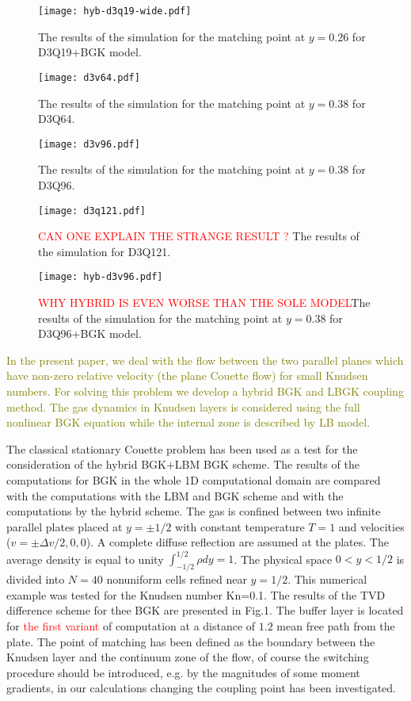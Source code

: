 \documentclass[]{elsarticle} %
\newcommand{\todo}[1]{\textcolor{olive}{#1}}
\begin{document}
{\begin{figure}[!h]
\centering
\texttt{[image: hyb-d3q19-wide.pdf]}
\caption{The  results of the simulation for the matching point at $y=0.26$ for D3Q19+BGK model.}
\end{figure}


\begin{figure}[!h]
\centering
\texttt{[image: d3v64.pdf]}
\caption{The  results of the simulation for the matching point at $y=0.38$ for D3Q64.}
\end{figure}


\begin{figure}[!h]
\centering
\texttt{[image: d3v96.pdf]}
\caption{The  results of the simulation for the matching point at $y=0.38$ for D3Q96.}
\end{figure}


\begin{figure}[!h]
\centering
\texttt{[image: d3q121.pdf]}
\caption{\textcolor{red}{CAN ONE EXPLAIN THE STRANGE RESULT ?} The  results of the simulation  for D3Q121.}
\end{figure}



\begin{figure}[!h]
\centering
\texttt{[image: hyb-d3v96.pdf]}
\caption{\textcolor{red}{WHY HYBRID IS EVEN WORSE THAN THE SOLE  MODEL}The  results of the simulation for the matching point at $y=0.38$ for D3Q96+BGK model.}
\end{figure}




\todo{In the present paper, we deal with the flow between the two parallel planes which have non-zero relative velocity (the plane Couette flow) for small Knudsen numbers. For solving this problem we develop a hybrid BGK and LBGK coupling method. The gas dynamics in Knudsen layers is considered using the full nonlinear BGK equation while the internal zone is described by LB model.}

The classical stationary Couette problem has been used as a test for the consideration of the hybrid BGK+LBM BGK scheme. The results of the computations for BGK in the whole 1D computational domain are compared with the computations with the LBM and BGK scheme and with the computations by the hybrid scheme. The gas is confined between two infinite parallel plates placed at $y = \pm 1/2$ with constant temperature $T = 1$ and velocities ($v = \pm\Delta v/2,0,0$). A complete diffuse reflection are assumed at the plates. The average density is equal to unity $\int_{-1/2}^{1/2}\rho dy=1$. The physical space $0 < y < 1/2$ is divided into $N = 40$ nonuniform cells refined near $y = 1/2$. This numerical example was tested for the Knudsen number Kn=0.1. The results of the TVD difference scheme for thee BGK  are presented in Fig.1. The buffer layer is located for \textcolor{red}{the first variant} of computation at a distance of $1.2$ mean free path from the plate. The point of matching has been defined as the boundary between the Knudsen layer and the continuum zone of the flow, of course the switching procedure should be introduced, e.g. by the magnitudes of some moment gradients, in our calculations changing the coupling point has been investigated.


}
\end{document}
